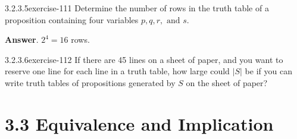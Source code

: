 \documentclass[twoside,10pt,]{book}
\numberwithin{equation}{section}
\begin{document}
\begin{divisionsolution}{3.2.3.5}{}{exercise-111}%
\hypertarget{p-984}{}%
Determine the number of rows in the truth table of a proposition containing four variables \(p, q, r, \textrm{ and }   s\).%
\par\smallskip%
\noindent\textbf{Answer}.\quad%
\hypertarget{p-985}{}%
\(2^4 = 16\) rows.%
\end{divisionsolution}%
\begin{divisionsolution}{3.2.3.6}{}{exercise-112}%
\hypertarget{p-986}{}%
If there are 45 lines on a sheet of paper, and you want to reserve one line for each line in a truth table, how large could \(\lvert S\rvert \) be if you can write truth tables of propositions generated by \(S\) on the sheet of paper?%
\end{divisionsolution}%
\section*{3.3 Equivalence and Implication}
\end{document}
